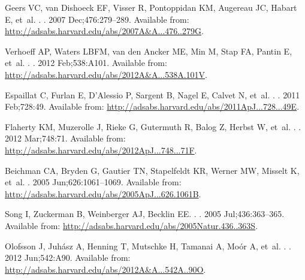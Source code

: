 \documentclass[]{rsos}
\begin{document}
\begin{thebibliography}{10}
{Geers} VC, {van Dishoeck} EF, {Visser} R, {Pontoppidan} KM, {Augereau} JC,
  {Habart} E, et~al.
.
\newblock \aap. 2007 Dec;476:279--289.
\newblock Available from:
  \url{http://adsabs.harvard.edu/abs/2007A&A...476..279G}.

{Verhoeff} AP, {Waters} LBFM, {van den Ancker} ME, {Min} M, {Stap} FA, {Pantin}
  E, et~al.
.
\newblock \aap. 2012 Feb;538:A101.
\newblock Available from:
  \url{http://adsabs.harvard.edu/abs/2012A&A...538A.101V}.

{Espaillat} C, {Furlan} E, {D'Alessio} P, {Sargent} B, {Nagel} E, {Calvet} N,
  et~al.
.
\newblock \apj. 2011 Feb;728:49.
\newblock Available from:
  \url{http://adsabs.harvard.edu/abs/2011ApJ...728...49E}.

{Flaherty} KM, {Muzerolle} J, {Rieke} G, {Gutermuth} R, {Balog} Z, {Herbst} W,
  et~al.
.
\newblock \apj. 2012 Mar;748:71.
\newblock Available from:
  \url{http://adsabs.harvard.edu/abs/2012ApJ...748...71F}.

{Beichman} CA, {Bryden} G, {Gautier} TN, {Stapelfeldt} KR, {Werner} MW,
  {Misselt} K, et~al.
\newblock \apj. 2005 Jun;626:1061--1069.
\newblock Available from:
  \url{http://adsabs.harvard.edu/abs/2005ApJ...626.1061B}.

{Song} I, {Zuckerman} B, {Weinberger} AJ, {Becklin} EE.
.
\newblock \nat. 2005 Jul;436:363--365.
\newblock Available from:
  \url{http://adsabs.harvard.edu/abs/2005Natur.436..363S}.

{Olofsson} J, {Juh{\'a}sz} A, {Henning} T, {Mutschke} H, {Tamanai} A,
  {Mo{\'o}r} A, et~al.
.
\newblock \aap. 2012 Jun;542:A90.
\newblock Available from:
  \url{http://adsabs.harvard.edu/abs/2012A&A...542A..90O}.


\end{thebibliography}
\end{document}
